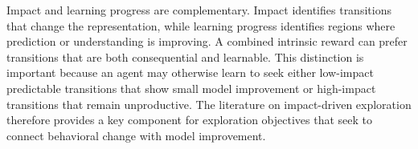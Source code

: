 Impact and learning progress are complementary.
Impact identifies transitions that change the representation, while learning progress identifies regions where prediction or understanding is improving.
A combined intrinsic reward can prefer transitions that are both consequential and learnable.
This distinction is important because an agent may otherwise learn to seek either low-impact predictable transitions that show small model improvement or high-impact transitions that remain unproductive.
The literature on impact-driven exploration therefore provides a key component for exploration objectives that seek to connect behavioral change with model improvement.